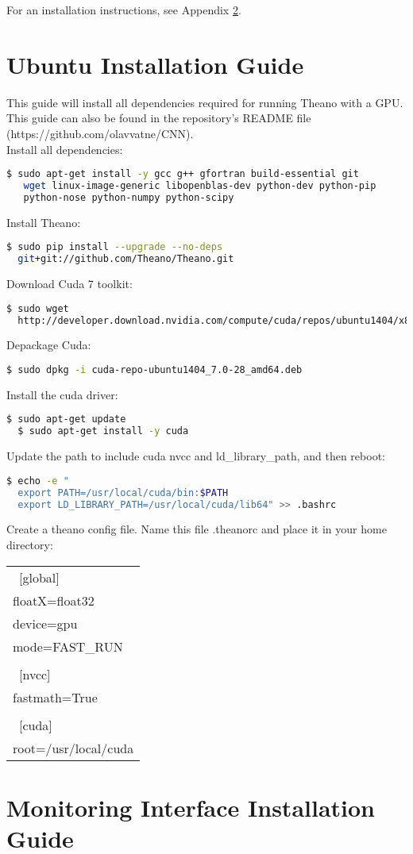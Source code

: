 For an installation instructions, see Appendix \ref{app:monitorInstall}.


\section{Ubuntu Installation Guide}
\label{app:ubuntuInstall}
This guide will install all dependencies required for running Theano with a GPU. This guide can also be found in the repository's README file (https://github.com/olavvatne/CNN).
\\

\noindent Install all dependencies:
\begin{lstlisting}[language=bash]
  $ sudo apt-get install -y gcc g++ gfortran build-essential git
   wget linux-image-generic libopenblas-dev python-dev python-pip 
   python-nose python-numpy python-scipy  
\end{lstlisting}


\noindent Install Theano:
\begin{lstlisting}[language=bash]
  $ sudo pip install --upgrade --no-deps 
  git+git://github.com/Theano/Theano.git
\end{lstlisting}


\noindent Download Cuda 7 toolkit:
\begin{lstlisting}[language=bash]
  $ sudo wget 
  http://developer.download.nvidia.com/compute/cuda/repos/ubuntu1404/x86_64/cuda-repo-ubuntu1404_7.0-28_amd64.deb
\end{lstlisting}


\noindent Depackage Cuda:
\begin{lstlisting}[language=bash]
  $ sudo dpkg -i cuda-repo-ubuntu1404_7.0-28_amd64.deb  
\end{lstlisting}


\noindent Install the cuda driver:
\begin{lstlisting}[language=bash]
  $ sudo apt-get update
  $ sudo apt-get install -y cuda  
\end{lstlisting}

\noindent Update the path to include cuda nvcc and ld\_library\_path, and then reboot:
\begin{lstlisting}[language=bash]
  $ echo -e "
  export PATH=/usr/local/cuda/bin:$PATH
  export LD_LIBRARY_PATH=/usr/local/cuda/lib64" >> .bashrc  
\end{lstlisting}

\noindent  Create a theano config file. Name this file .theanorc and place it in your home directory:\\
\begin{tabular}{ l }
  \hline			
  ~[global] \\
  floatX=float32 \\
  device=gpu \\
  mode=FAST\_RUN \\
  \\
  ~[nvcc] \\
  fastmath=True \\
  \\
  ~[cuda] \\
  root=/usr/local/cuda \\
  \hline  
\end{tabular}

\section{Monitoring Interface Installation Guide}
\label{app:monitorInstall}